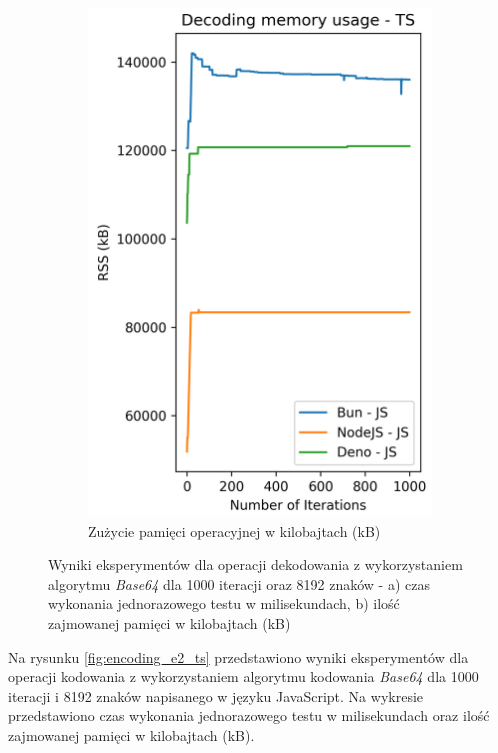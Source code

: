 \begin{figure}[H]
\begin{subfigure}[b]{0.4\textwidth}
    \includegraphics[width=\textwidth]{Figures/coding/base64_1000_decoding_js_memory.png}
    \caption{Zużycie pamięci operacyjnej w kilobajtach (kB)}
    \label{fig:decoding_e2_js_memory}
  \end{subfigure}
  \hfill
  \caption{Wyniki eksperymentów dla operacji dekodowania z wykorzystaniem algorytmu \textit{Base64} dla 1000 iteracji oraz 8192 znaków - a) czas wykonania jednorazowego testu w milisekundach, b) ilość zajmowanej pamięci w kilobajtach (kB)}
  \label{fig:decoding_e2_js}
\end{figure}

Na rysunku \ref{fig:encoding_e2_ts} przedstawiono wyniki eksperymentów dla operacji kodowania z wykorzystaniem algorytmu kodowania \textit{Base64} dla 1000 iteracji i 8192 znaków napisanego w języku JavaScript. Na wykresie przedstawiono czas wykonania jednorazowego testu w milisekundach oraz ilość zajmowanej pamięci w kilobajtach (kB).

